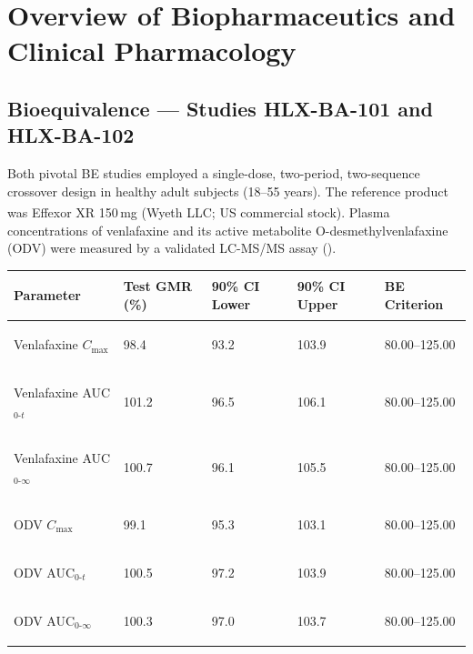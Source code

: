 \section{Overview of Biopharmaceutics and Clinical Pharmacology}
\label{sec:pk}

\subsection{Bioequivalence --- Studies HLX-BA-101 and HLX-BA-102}
\label{sec:be}

Both pivotal BE studies employed a single-dose, two-period, two-sequence crossover design
in healthy adult subjects (18--55 years). The reference product was
Effexor\textsuperscript{\textregistered} XR 150\,mg (Wyeth LLC; US commercial stock).
Plasma concentrations of venlafaxine and its active metabolite O-desmethylvenlafaxine (ODV)
were measured by a validated LC-MS/MS assay
().

\vspace{2mm}

\renewcommand{\arraystretch}{1.3}
\begin{tabularx}{\linewidth}{@{}
  >{\bfseries\small\raggedright\arraybackslash}X
  >{\centering\arraybackslash\small}p{24mm}
  >{\centering\arraybackslash\small}p{24mm}
  >{\centering\arraybackslash\small}p{24mm}
  >{\centering\arraybackslash\small}p{22mm}
@{}}
\toprule
\TH
\color{white}\textbf{Parameter} &
\color{white}\textbf{Test GMR (\%)} &
\color{white}\textbf{90\% CI Lower} &
\color{white}\textbf{90\% CI Upper} &
\color{white}\textbf{BE Criterion} \\
\midrule
\RA Venlafaxine $C_{\max}$         & 98.4  & 93.2 & 103.9 & 80.00--125.00 \\
\RB Venlafaxine AUC$_{0\text{-}t}$ & 101.2 & 96.5 & 106.1 & 80.00--125.00 \\
\RA Venlafaxine AUC$_{0\text{-}\infty}$ & 100.7 & 96.1 & 105.5 & 80.00--125.00 \\
\RB ODV $C_{\max}$                 & 99.1  & 95.3 & 103.1 & 80.00--125.00 \\
\RA ODV AUC$_{0\text{-}t}$         & 100.5 & 97.2 & 103.9 & 80.00--125.00 \\
\RB ODV AUC$_{0\text{-}\infty}$    & 100.3 & 97.0 & 103.7 & 80.00--125.00 \\
\bottomrule
\end{tabularx}

